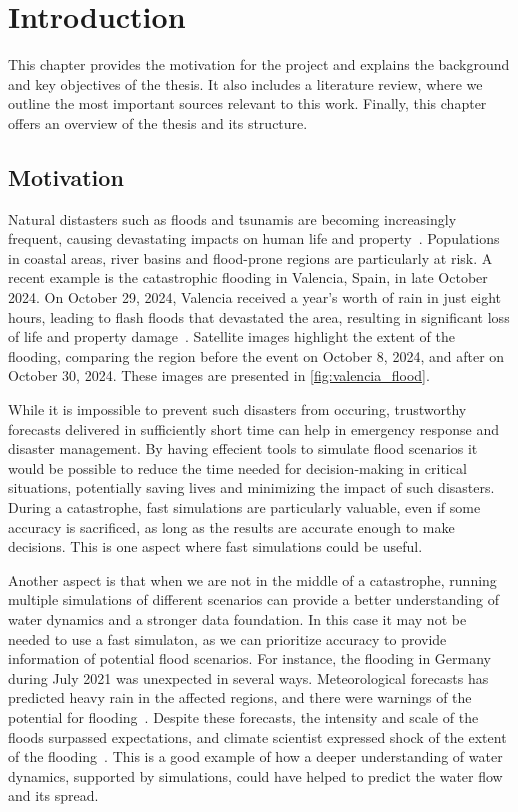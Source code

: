 \chapter{Introduction}
This chapter provides the motivation for the project and explains the background and key objectives of the thesis.
It also includes a literature review, where we outline the most important sources relevant to this work.
Finally, this chapter offers an overview of the thesis and its structure.

\section{Motivation}
Natural distasters such as floods and tsunamis are becoming increasingly frequent, causing devastating impacts on human life and property~\cite{najibi2018global_floods}.
Populations in coastal areas, river basins and flood-prone regions are particularly at risk.
A recent example is the catastrophic flooding in Valencia, Spain, in late October 2024.
On October 29, 2024, Valencia received a year's worth of rain in just eight hours, leading to flash floods that devastated the area, resulting in significant loss of life and property damage~\cite{valencia_flood_disaster_esa}.
Satellite images highlight the extent of the flooding, comparing the region before the event on October 8, 2024, and after on October 30, 2024.
These images are presented in \autoref{fig:valencia_flood}.

While it is impossible to prevent such disasters from occuring, trustworthy forecasts delivered in sufficiently short time can help in emergency response and disaster management.
By having effecient tools to simulate flood scenarios it would be possible to reduce the time needed for decision-making in critical situations, potentially saving lives and minimizing the impact of such disasters.
During a catastrophe, fast simulations are particularly valuable, even if some accuracy is sacrificed, as long as the results are accurate enough to make decisions.
This is one aspect where fast simulations could be useful.

Another aspect is that when we are not in the middle of a catastrophe, running multiple simulations of different scenarios can provide a better understanding of water dynamics and a stronger data foundation.
In this case it may not be needed to use a fast simulaton, as we can prioritize accuracy to provide information of potential flood scenarios.
For instance, the flooding in Germany during July 2021 was unexpected in several ways.
Meteorological forecasts has predicted heavy rain in the affected regions, and there were warnings of the potential for flooding~\cite{fathom_floods_2021}.
Despite these forecasts, the intensity and scale of the floods surpassed expectations, and climate scientist expressed shock of the extent of the flooding~\cite{guardian_floods_2021}.
This is a good example of how a deeper understanding of water dynamics, supported by simulations, could have helped to predict the water flow and its spread.

